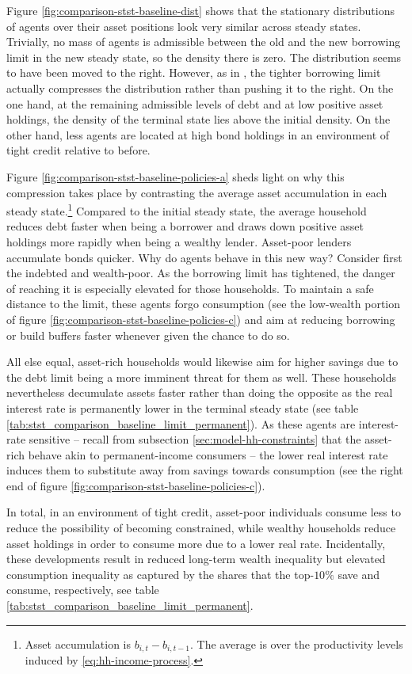 \documentclass[a4paper,12pt]{article} %
\numberwithin{equation}{section} %
\numberwithin{figure}{section}
\numberwithin{table}{section}
\begin{document}
Figure \ref{fig:comparison-stst-baseline-dist} shows that the stationary distributions of agents over their asset positions look very similar across steady states. Trivially, no mass of agents is admissible between the old and the new borrowing limit in the new steady state, so the density there is zero. The distribution seems to have been moved to the right. However, as in \textcite{gl2017}, the tighter borrowing limit actually compresses the distribution rather than pushing it to the right. On the one hand, at the remaining admissible levels of debt and at low positive asset holdings, the density of the terminal state lies above the initial density. On the other hand, less agents are located at high bond holdings in an environment of tight credit relative to before.

Figure \ref{fig:comparison-stst-baseline-policies-a} sheds light on why this compression takes place by contrasting the average asset accumulation in each steady state.\footnote{Asset accumulation is $b_{i,t} - b_{i,t-1}$. The average is over the productivity levels induced by \eqref{eq:hh-income-process}.} Compared to the initial steady state, the average household reduces debt faster when being a borrower and draws down positive asset holdings more rapidly when being a wealthy lender. Asset-poor lenders accumulate bonds quicker. Why do agents behave in this new way? Consider first the indebted and wealth-poor. As the borrowing limit has tightened, the danger of reaching it is especially elevated for those households. To maintain a safe distance to the limit, these agents forgo consumption (see the low-wealth portion of figure \ref{fig:comparison-stst-baseline-policies-c}) and aim at reducing borrowing or build buffers faster whenever given the chance to do so.

All else equal, asset-rich households would likewise aim for higher savings due to the debt limit being a more imminent threat for them as well. These households nevertheless decumulate assets faster rather than doing the opposite as the real interest rate is permanently lower in the terminal steady state (see table \ref{tab:stst_comparison_baseline_limit_permanent}). As these agents are interest-rate sensitive -- recall from subsection \ref{sec:model-hh-constraints} that the asset-rich behave akin to permanent-income consumers -- the lower real interest rate induces them to substitute away from savings towards consumption (see the right end of figure \ref{fig:comparison-stst-baseline-policies-c}). 

In total, in an environment of tight credit, asset-poor individuals consume less to reduce the possibility of becoming constrained, while wealthy households reduce asset holdings in order to consume more due to a lower real rate. Incidentally, these developments result in reduced long-term wealth inequality but elevated consumption inequality as captured by the shares that the top-$10\%$ save and consume, respectively, see table \ref{tab:stst_comparison_baseline_limit_permanent}.
\end{document}
